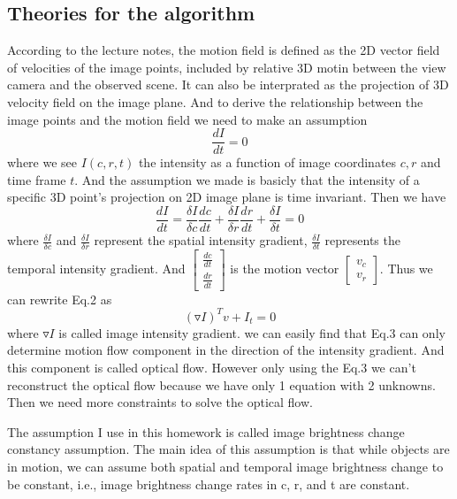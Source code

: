 \documentclass{article}
\begin{document}
\subsection*{Theories for the algorithm}
\par
According to the lecture notes, the motion field is defined as the 2D vector field of velocities of the image points, included by relative 3D motin between the view camera and the observed scene. It can also be interprated as the projection of 3D velocity field on the image plane.\cite{ref1} And to derive the relationship between the image points and the motion field we need to make an assumption
\begin{equation}
\frac{dI}{dt}=0
\end{equation}
where we see $I(c,r,t)$ the intensity as a function of image coordinates $c, r$ and time frame $t$. And the assumption we made is basicly that the intensity of a specific 3D point's projection on 2D image plane is time invariant. Then we have
\begin{equation}
\frac{dI}{dt}=\frac{\delta I}{\delta c}\frac{dc}{dt}+\frac{\delta I}{\delta r}\frac{dr}{dt}+\frac{\delta I}{\delta t}=0
\end{equation}
where $\frac{\delta I}{\delta c}$ and $\frac{\delta I}{\delta r}$ represent the spatial intensity gradient, $\frac{\delta I}{\delta t}$ represents the temporal intensity gradient. And $\begin{bmatrix}\frac{dc}{dt}\\\frac{dr}{dt}\end{bmatrix}$ is the motion vector $\begin{bmatrix}v_c\\v_r\end{bmatrix}$. Thus we can rewrite Eq.2 as 
\begin{equation}
(\triangledown I)^Tv+I_t=0
\end{equation}
where $\triangledown I$ is called image intensity gradient. we can easily find that Eq.3 can only determine motion flow component in the direction of the intensity gradient. And this component is called optical flow. However only using the Eq.3 we can't reconstruct the optical flow because we have only 1 equation with 2 unknowns. Then we need more constraints to solve the optical flow.
\par 
The assumption I use in this homework is called image brightness change constancy assumption. The main idea of this assumption is that while objects are in motion, we can assume both spatial and temporal image brightness change to be constant, i.e., image brightness change rates in c, r, and t are constant.\cite{ref1} 
\end{document}
